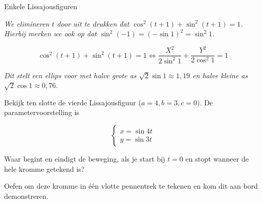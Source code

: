 \begin{lesactiviteit}{Enkele Lissajousfiguren}
\begin{vraagenantwoord}[resume]
    \emph{We elimineren $t$ door uit te drukken dat $\cos^2{(t+1)}+\sin^2{(t+1)}=1$. Hierbij merken we ook op dat $\sin^2{(-1)}=(-\sin{1})^2=\sin^2{1}$.}
    
    $$
    \cos^2{(t+1)}+\sin^2{(t+1)}=1\Leftrightarrow \frac{X^2}{2\sin^2{1}}+\frac{Y^2}{2\cos^2{1}}=1
    $$
    
    \emph{Dit stelt een ellips voor met halve grote as $\sqrt{2}\sin{1}\approx 1,19$ en halve kleine as $\sqrt{2}\cos{1}\approx 0,76$.}
    
    \end{vraagenantwoord}
        

    Bekijk ten slotte de vierde Lissajousfiguur ($a=4, b=3, c=0)$. De parametervoorstelling is
    
    $$\left\{ 
    \begin{array}{l}
         x = \sin{4t}\\
         y = \sin{3t}
    \end{array}
    \right.$$
    
    \begin{vraagenantwoord}[resume]
    
    \item Waar begint en eindigt de beweging, als je start bij $t=0$ en stopt wanneer de hele kromme getekend is? 
    
    
    \item Oefen om deze kromme in één vlotte pennentrek te tekenen en kom dit aan bord demonstreren.
    
    \end{vraagenantwoord}
    

\end{lesactiviteit}


